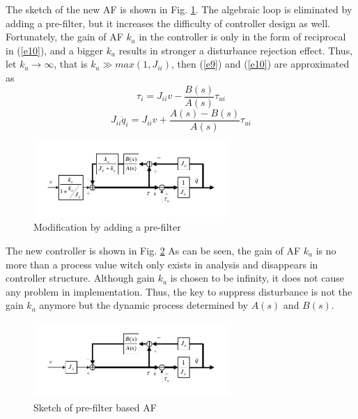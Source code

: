 \documentclass[letterpaper, 10 pt, conference]{ieeeconf}  %
\begin{document}
The sketch of the new AF is shown in Fig. \ref{f3}.
The algebraic loop is eliminated by adding a pre-filter, but it increases the difficulty of controller design as well.
Fortunately, the gain of AF $k_a$ in the controller is only in the form of reciprocal in (\ref{e10}), and a bigger $k_a$ results in stronger a disturbance rejection effect.
Thus, let $k_a\rightarrow\infty$, that is $k_a\gg max(1,J_{ii})$, then (\ref{e9}) and (\ref{e10}) are approximated as
\begin{equation}
    \tau_i = J_{ii}v - \frac{B(s)}{A(s)}\tau_{ui} 
    \label{e11}
\end{equation}
\begin{equation}
    J_{ii}\ddot{q}_i = J_{ii}v + \frac{A(s) - B(s)}{A(s)}\tau_{ui} 
    \label{e12}
\end{equation}
\begin{figure}[t]
    \centering
    \includegraphics[width=2.95in]{illustrations/fig3.pdf}
    \caption{Modification by adding a pre-filter}
    \label{f3}
\end{figure}

The new controller is shown in Fig. \ref{f4}
As can be seen, the gain of AF $k_a$ is no more than a process value witch only exists in analysis and disappears in controller structure.
Although gain $k_a$ is chosen to be infinity, it does not cause any problem in implementation.
Thus, the key to suppress disturbance is not the gain $k_a$ anymore but the dynamic process determined by $A(s)$ and $B(s)$.

\begin{figure}[h]
    \centering
    \includegraphics[width=2.95in]{illustrations/fig4.pdf}
    \caption{Sketch of pre-filter based AF}
    \label{f4}
\end{figure}
\end{document}
